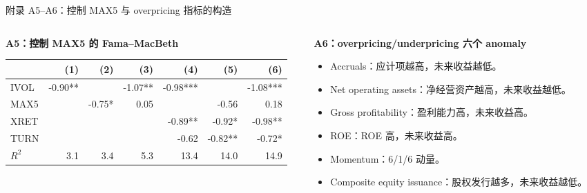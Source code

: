 \documentclass[aspectratio=169,10pt]{beamer}
\begin{document}
\begin{frame}{附录 A5--A6：控制 MAX5 与 overpricing 指标的构造}
	\begin{columns}[t]
		\begin{column}{0.48\textwidth}
			\textbf{A5：控制 MAX5 的 Fama--MacBeth}
			\scriptsize
			\begin{tabular}{lrrrrrr}
				\toprule
				& (1)&(2)&(3)&(4)&(5)&(6)\\
				\midrule
				IVOL & -0.90**&&-1.07**&-0.98***&&-1.08***\\
				MAX5 &&-0.75*&0.05&&-0.56&0.18\\
				XRET &&&&-0.89**&-0.92*&-0.98**\\
				TURN &&&&-0.62&-0.82**&-0.72*\\
				$R^2$ &3.1&3.4&5.3&13.4&14.0&14.9\\
				\bottomrule
			\end{tabular}
		\end{column}
		\begin{column}{0.52\textwidth}
			\textbf{A6：overpricing/underpricing 六个 anomaly}
			\scriptsize
			\begin{itemize}
				\item Accruals：应计项越高，未来收益越低。
				\item Net operating assets：净经营资产越高，未来收益越低。
				\item Gross profitability：盈利能力高，未来收益高。
				\item ROE：ROE 高，未来收益高。
				\item Momentum：6/1/6 动量。
				\item Composite equity issuance：股权发行越多，未来收益越低。
			\end{itemize}
		\end{column}
	\end{columns}
\end{frame}
\end{document}
